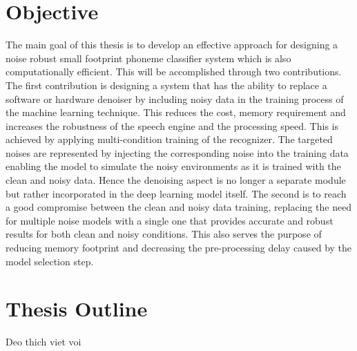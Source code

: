     \section{Objective} \label{sec:intro_objective}
        The main goal of this thesis is to develop an effective approach for designing a noise robust small footprint phoneme classifier system which is also computationally efficient. 
        This will be accomplished through two contributions. 
        The first contribution is designing a system that has the ability to replace a software or hardware denoiser by including noisy data in the training process of the machine learning technique. 
        This reduces the cost, memory requirement and increases the robustness of the speech engine and the processing speed.
        This is achieved by applying multi-condition training of the recognizer. 
        The targeted noises are represented by injecting the corresponding noise into the training data enabling the model to simulate the noisy environments as it is trained with the clean and noisy data.
        Hence the denoising aspect is no longer a separate module but rather incorporated in the deep learning model itself.
        The second is to reach a good compromise between the clean and noisy data training, replacing the need for multiple noise models with a single one that provides accurate and robust results for both clean and noisy conditions. 
        This also serves the purpose of reducing memory footprint and decreasing the pre-processing delay caused by the model selection step.

    \section{Thesis Outline} \label{sec:intro_outline}
        Deo thich viet voi

